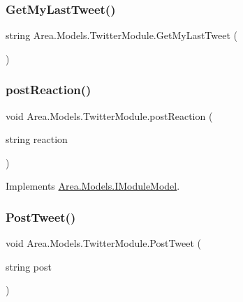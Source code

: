 \subsubsection{\texorpdfstring{Get\+My\+Last\+Tweet()}{GetMyLastTweet()}}
{\footnotesize\ttfamily string Area.\+Models.\+Twitter\+Module.\+Get\+My\+Last\+Tweet (\begin{DoxyParamCaption}{ }\end{DoxyParamCaption})\hspace{0.3cm}{\ttfamily [inline]}}

\mbox{\label{classArea_1_1Models_1_1TwitterModule_a2dd56c4273c09ea000d0229bb9d19019}} 
\subsubsection{\texorpdfstring{post\+Reaction()}{postReaction()}}
{\footnotesize\ttfamily void Area.\+Models.\+Twitter\+Module.\+post\+Reaction (\begin{DoxyParamCaption}\item[{string}]{reaction }\end{DoxyParamCaption})\hspace{0.3cm}{\ttfamily [inline]}}



Implements \mbox{\hyperlink{interfaceArea_1_1Models_1_1IModuleModel_af2c1a82bd894255ab2099440f4f3d6f7}{Area.\+Models.\+I\+Module\+Model}}.

\mbox{\label{classArea_1_1Models_1_1TwitterModule_a6baea70831508a7115930746687eabbd}} 
\subsubsection{\texorpdfstring{Post\+Tweet()}{PostTweet()}}
{\footnotesize\ttfamily void Area.\+Models.\+Twitter\+Module.\+Post\+Tweet (\begin{DoxyParamCaption}\item[{string}]{post }\end{DoxyParamCaption})\hspace{0.3cm}{\ttfamily [inline]}}



